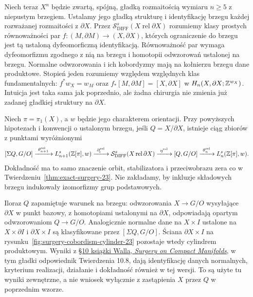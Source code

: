 Niech teraz $X^n$ będzie zwartą, spójną,
gładką rozmaitością wymiaru $n\geq5$
z niepustym brzegiem. Ustalamy jego
gładką strukturę i identyfikację brzegu
każdej rozważanej rozmaitości z $\partial X$.
Przez $\mathcal S^s_{\mathrm{DIFF}}(X\operatorname{rel}\partial X)$
rozumiemy klasy prostych równoważności par
$f:(M,\partial M)\to(X,\partial X)$,
których ograniczenie do brzegu jest tą
ustaloną dyfeomorficzną identyfikacją.
Równoważność par wymaga dyfeomorfizmu
zgodnego z nią na brzegu i homotopii
odwzorowań ustalonej na brzegu.
Normalne odwzorowania i ich kobordyzmy
mają na kołnierzu brzegu dane produktowe.
Stopień jeden rozumiemy względem
względnych klas fundamentalnych:
$f^*w_X=w_M$ oraz
$f_*[M,\partial M]=[X,\partial X]$
w $H_n(X,\partial X;\mathbb{Z}^{w_X})$.
Intuicja jest taka sama jak poprzednio,
ale żadna chirurgia nie zmienia już
zadanej gładkiej struktury na $\partial X$.

\begin{twierdzenie}
\label{thm:relative-surgery-23}
Niech $\pi=\pi_1(X)$, a $w$ będzie jego
charakterem orientacji. Przy powyższych
hipotezach i konwencji o ustalonym brzegu,
jeśli $Q=X/\partial X$, istnieje ciąg
zbiorów z punktami wyróżnionymi
\begin{equation}\label{eq:relative-surgery-23}
 [\Sigma Q,G/O]\xrightarrow{\ \theta_{n+1}^{\mathrm{rel}}\ }
 L_{n+1}^s(\mathbb{Z}[\pi],w)
 \xrightarrow{\ \partial_{\!s}^{\mathrm{rel}}\ }
 \mathcal S^s_{\mathrm{DIFF}}(X\operatorname{rel}\partial X)
 \xrightarrow{\ \eta^{\mathrm{rel}}\ }
 [Q,G/O]
 \xrightarrow{\ \theta_n^{\mathrm{rel}}\ }
 L_n^s(\mathbb{Z}[\pi],w).
\end{equation}
Dokładność ma to samo znaczenie orbit,
stabilizatora i przeciwobrazu zera co
w Twierdzeniu~\ref{thm:exact-surgery-23}.
Nie zakładamy, by inkluzje składowych
brzegu indukowały izomorfizmy grup
podstawowych.
\end{twierdzenie}

Iloraz $Q$ zapamiętuje warunek na brzegu:
odwzorowania $X\to G/O$ wysyłające
$\partial X$ w punkt bazowy, z homotopiami
ustalonymi na $\partial X$, odpowiadają
opartym odwzorowaniom $Q\to G/O$.
Analogicznie normalne dane na $X\times I$
ustalone na $X\times\partial I$ i
$\partial X\times I$ są klasyfikowane przez
$[\Sigma Q,G/O]$. Ściana $\partial X\times I$
na rysunku~\ref{fig:surgery-cobordism-cylinder-23}
pozostaje wtedy cylindrem produktowym.
Wyniki z
\href{https://webhomes.maths.ed.ac.uk/~v1ranick/books/scm.pdf}
{§10 książki Walla, \emph{Surgery on Compact Manifolds}},
w tym gładki odpowiednik Twierdzenia 10.8,
dają identyfikację danych normalnych,
kryterium realizacji, działanie i dokładność
również w tej wersji. To są użyte tu
wyniki zewnętrzne, a nie wniosek wyłącznie
z zastąpienia $X$ przez $Q$ w poprzednim wzorze.

